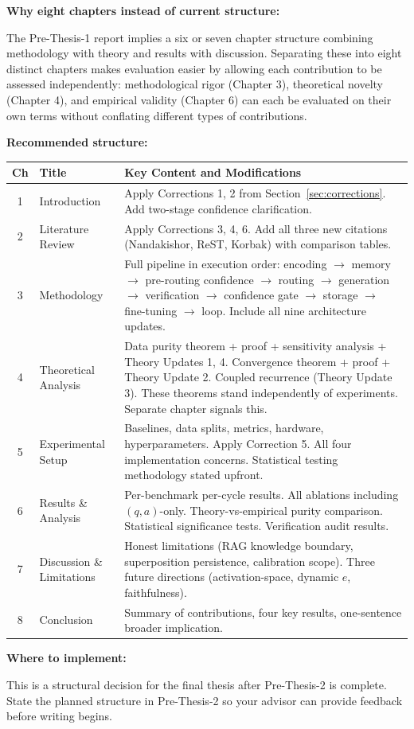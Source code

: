 \documentclass[11pt,a4paper]{article}
\newcommand{\implementbox}[2]{%
\begin{tcolorbox}[enhanced,breakable,
  colback=LightSlate,colframe=Slate,boxrule=1.5pt,arc=4pt,
  left=8pt,right=8pt,top=6pt,bottom=6pt,
  title={\bfseries\small\color{white}#1},
  attach boxed title to top left={yshift=-2mm,xshift=6mm},
  boxed title style={colback=Slate,arc=3pt,boxrule=0pt,
    left=4pt,right=4pt,top=2pt,bottom=2pt}]
#2
\end{tcolorbox}}
\begin{document}
\implementbox{WRITING IMPROVEMENT 2: Recommended Thesis Structure}{
\textbf{Why eight chapters instead of current structure:}

The Pre-Thesis-1 report implies a six or seven chapter structure combining methodology with theory and results with discussion. Separating these into eight distinct chapters makes evaluation easier by allowing each contribution to be assessed independently: methodological rigor (Chapter 3), theoretical novelty (Chapter 4), and empirical validity (Chapter 6) can each be evaluated on their own terms without conflating different types of contributions.

\textbf{Recommended structure:}

\begin{center}
\small
\begin{tabular}{clp{9cm}}
\toprule
\textbf{Ch} & \textbf{Title} & \textbf{Key Content and Modifications} \\
\midrule
1 & Introduction & Apply Corrections 1, 2 from Section~\ref{sec:corrections}. Add two-stage confidence clarification. \\
2 & Literature Review & Apply Corrections 3, 4, 6. Add all three new citations (Nandakishor, ReST, Korbak) with comparison tables. \\
3 & Methodology & Full pipeline in execution order: encoding $\to$ memory $\to$ pre-routing confidence $\to$ routing $\to$ generation $\to$ verification $\to$ confidence gate $\to$ storage $\to$ fine-tuning $\to$ loop. Include all nine architecture updates. \\
4 & Theoretical Analysis & Data purity theorem + proof + sensitivity analysis + Theory Updates 1, 4. Convergence theorem + proof + Theory Update 2. Coupled recurrence (Theory Update 3). These theorems stand independently of experiments. Separate chapter signals this. \\
5 & Experimental Setup & Baselines, data splits, metrics, hardware, hyperparameters. Apply Correction 5. All four implementation concerns. Statistical testing methodology stated upfront. \\
6 & Results \& Analysis & Per-benchmark per-cycle results. All ablations including $(q,a)$-only. Theory-vs-empirical purity comparison. Statistical significance tests. Verification audit results. \\
7 & Discussion \& Limitations & Honest limitations (RAG knowledge boundary, superposition persistence, calibration scope). Three future directions (activation-space, dynamic $e$, faithfulness). \\
8 & Conclusion & Summary of contributions, four key results, one-sentence broader implication. \\
\bottomrule
\end{tabular}
\end{center}

\textbf{Where to implement:}

This is a structural decision for the final thesis after Pre-Thesis-2 is complete. State the planned structure in Pre-Thesis-2 so your advisor can provide feedback before writing begins.
}
\end{document}
